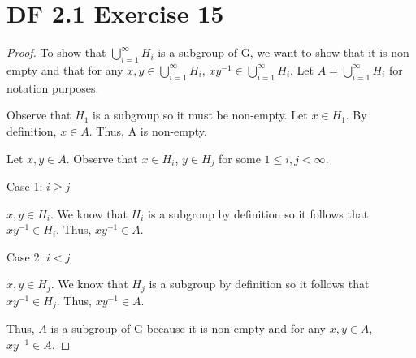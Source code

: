 \documentclass{article}
\begin{document}
\section{DF 2.1 Exercise 15}
\begin{proof}
To show that $\bigcup\limits_{i=1}^{\infty} H_i$ is a subgroup of G, we want to show that it is non empty and that for any $x,y \in \bigcup\limits_{i=1}^{\infty} H_i$, $xy^{-1} \in \bigcup\limits_{i=1}^{\infty} H_i$. Let $A=\bigcup\limits_{i=1}^{\infty} H_i$ for notation purposes. 

Observe that $H_1$ is a subgroup so it must be non-empty. Let $x \in H_1$. By definition, $x \in A$. Thus, A is non-empty.

Let $x,y \in A$. Observe that $x \in H_i$, $y \in H_j$ for some $1 \leq i, j < \infty$.

Case 1: $i \geq j$

$x,y \in H_i$. We know that $H_i$ is a subgroup by definition so it follows that $xy^{-1} \in H_i$. Thus, $xy^{-1} \in A$.

Case 2: $i < j$

$x, y \in H_j$. We know that $H_j$ is a subgroup by definition so it follows that $xy^{-1} \in H_j$. Thus, $xy^{-1} \in A$.

Thus, $A$ is a subgroup of G because it is non-empty and for any $x, y \in A$, $xy^{-1} \in A$.
\end{proof}
\end{document}
